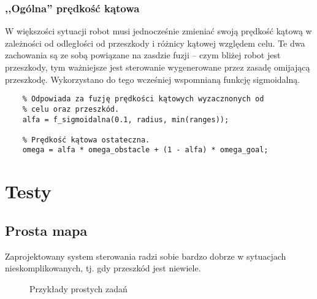 \documentclass[11pt]{article}
\begin{document}
\subsubsection*{,,Ogólna'' prędkość kątowa}

W większości sytuacji robot musi jednocześnie zmieniać swoją prędkość kątową w zależności od odległości od przeszkody i różnicy kątowej względem celu. Te dwa zachowania są ze sobą powiązane na zasdzie fuzji -- czym bliżej robot jest przeszkody, tym ważniejsze jest sterowanie wygenerowane przez zasadę omijającą przeszkodę. Wykorzystano do tego wcześniej wspomnianą funkcję sigmoidalną.
\begin{lstlisting}[firstnumber = 112]
    % Współczynnik alfa, przyjmuje wartości z zakresu 0 do 1.
    % Odpowiada za fuzję prędkości kątowych wyzacznonych od
    % celu oraz przeszkód.
    alfa = f_sigmoidalna(0.1, radius, min(ranges));
    
    % Prędkość kątowa ostateczna.
    omega = alfa * omega_obstacle + (1 - alfa) * omega_goal;
\end{lstlisting}

\newpage

\section{Testy}

\subsection{Prosta mapa}

Zaprojektowany system sterowania radzi sobie bardzo dobrze w sytuacjach nieskomplikowanych, tj. gdy przeszkód jest niewiele.

\newcommand{\w}{0.24}

\begin{figure}[h!]
	\centering
	
	\hfill
	\hfill
	\hfill
	
	\hfill
	\hfill
	\hfill
	
	\hfill
	\hfill
	\hfill
	
	\caption{Przykłady prostych zadań}
\end{figure}
\end{document}
